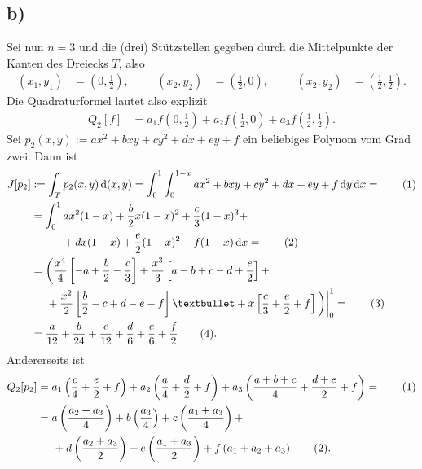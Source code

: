 \documentclass[english, parskip=full]{scrartcl}
\newcommand\numberthis{\addtocounter{equation}{1}\tag{\theequation}}
\newcommand{\intx}{}
\newcommand{\kla}{}
\newcommand{\klam}{}
\begin{document}
\subsection*{b)}
Sei nun $n=3$ und die (drei) Stützstellen gegeben durch die Mittelpunkte der Kanten des Dreiecks $T$, also
\begin{align}
(x_1,y_1)&=\kla\left( 0,\frac{1}{2} \right),&&&\kla\left( x_2,y_2 \right)&=\kla\left( \frac{1}{2},0 \right),&&&\kla\left( x_2,y_2 \right)&= \kla\left( \frac{1}{2},\frac{1}{2} \right).
\end{align}
Die Quadraturformel lautet also explizit
\begin{align}
Q_2[f]&= a_1f\kla\left( 0,\frac{1}{2} \right) + a_2f\kla\left( \frac{1}{2}, 0 \right) + a_3f\kla\left( \frac{1}{2},\frac{1}{2} \right).
\end{align}
Sei $p_2(x,y):=ax^2+bxy+cy^2+dx+ey+f$ ein beliebiges Polynom vom Grad zwei.
Dann ist
\begin{align*}
J[p_2]&:=\intx\int_{T}^{}p_2(x,y)\, \mathrm{d}(x,y)=\intx\int_{0}^{1}\intx\int_{0}^{1-x}ax^2+bxy+cy^2+dx+ey+f\, \mathrm{d}y\, \mathrm{d}x= \numberthis\\
&= \intx\int_{0}^{1}ax^2(1-x)+\frac{b}{2}x(1-x)^2 + \frac{c}{3}(1-x)^3 +\\
&\hspace{1cm} + dx(1-x) + \frac{e}{2}(1-x)^2 + f(1-x)\, \mathrm{d}x = \numberthis\\
&= \kla\bigg( \frac{x^4}{4}\klam\left[ -a + \frac{b}{2} - \frac{c}{3} \right] + \frac{x^3}{3}\klam\left[ a-b+c - d+\frac{e}{2} \right]+ \\
&\hspace{0.5cm} + \frac{x^2}{2}\klam\left[ \frac{b}{2} -c +d -e -f \right]•  +x\klam\left[ \frac{c}{3} + \frac{e}{2} + f \right] \bigg)\bigg\vert_0^1 =\numberthis\\
&= \frac{a}{12} + \frac{b}{24} +\frac{c}{12} + \frac{d}{6} + \frac{e}{6} +\frac{f}{2} \numberthis .
\end{align*}
Andererseits ist
\begin{align*}
Q_2[p_2] &= a_1\kla\left( \frac{c}{4}+\frac{e}{2}+f \right) + a_2\kla\left( \frac{a}{4} + \frac{d}{2} + f \right) + a_3\kla\left( \frac{a+b+c}{4}+\frac{d+e}{2}+f \right) = \numberthis \\
&=a\kla\left( \frac{a_2+a_3}{4} \right)+b\kla\left( \frac{a_3}{4} \right)+c\kla\left( \frac{a_1+a_3}{4} \right) +\\
&\hspace{0.5cm} + d\kla\left( \frac{a_2+a_3}{2} \right)+ e\kla\left( \frac{a_1 + a_3}{2} \right)+f\kla\left( a_1+a_2+a_3 \right) \numberthis  .
\end{align*}
\end{document}
